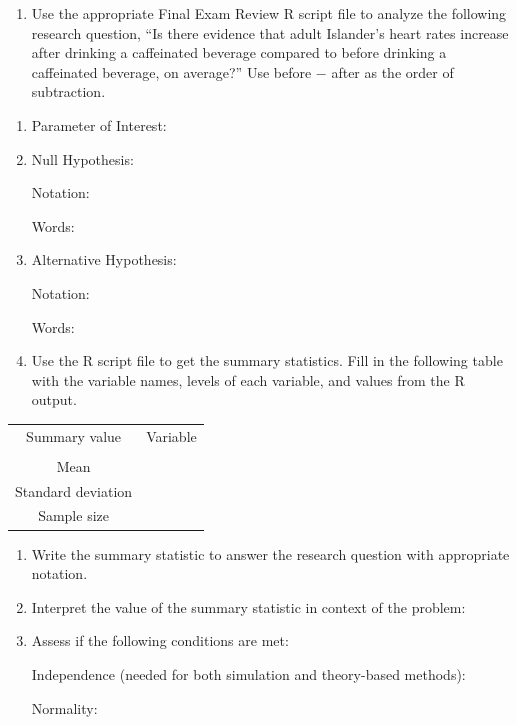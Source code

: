 \documentclass[
]{report}
\providecommand{\tightlist}{%
  \setlength{\itemsep}{0pt}\setlength{\parskip}{0pt}}
\begin{document}
\newpage

\begin{enumerate}
\def\labelenumi{\arabic{enumi}.}
\setcounter{enumi}{1}
\tightlist
\item
  Use the appropriate Final Exam Review R script file to analyze the following research question, ``Is there evidence that adult Islander's heart rates increase after drinking a caffeinated beverage compared to before drinking a caffeinated beverage, on average?'' Use before \(-\) after as the order of subtraction.
\end{enumerate}

\begin{enumerate}
\def\labelenumi{\alph{enumi}.}
\item
  Parameter of Interest:
  \vspace{0.3in}
\item
  Null Hypothesis:

  Notation:
  \vspace{0.3in}

  Words:
  \vspace{0.5in}
\item
  Alternative Hypothesis:

  Notation:
  \vspace{0.3in}

  Words:
  \vspace{0.5in}
\item
  Use the R script file to get the summary statistics. Fill in the following table with the variable names, levels of each variable, and values from the R output.
\end{enumerate}

\begingroup
\setlength{\tabcolsep}{14pt}
\renewcommand{\arraystretch}{2}
\begin{center}
\begin{tabular}{|c|p{1in}|}
\hline
 Summary value & Variable \\
 & \\ \hline
 Mean &  \\ \hline
 Standard deviation & \\ \hline
 Sample size & \\ \hline
\end{tabular}
\end{center}
\endgroup

\begin{enumerate}
\def\labelenumi{\alph{enumi}.}
\setcounter{enumi}{4}
\item
  Write the summary statistic to answer the research question with appropriate notation.
  \vspace{0.3in}
\item
  Interpret the value of the summary statistic in context of the problem:
  \vspace{0.3in}
\item
  Assess if the following conditions are met:

  Independence (needed for both simulation and theory-based methods):
  \vspace{0.8in}

  Normality:
\end{enumerate}
\end{document}
